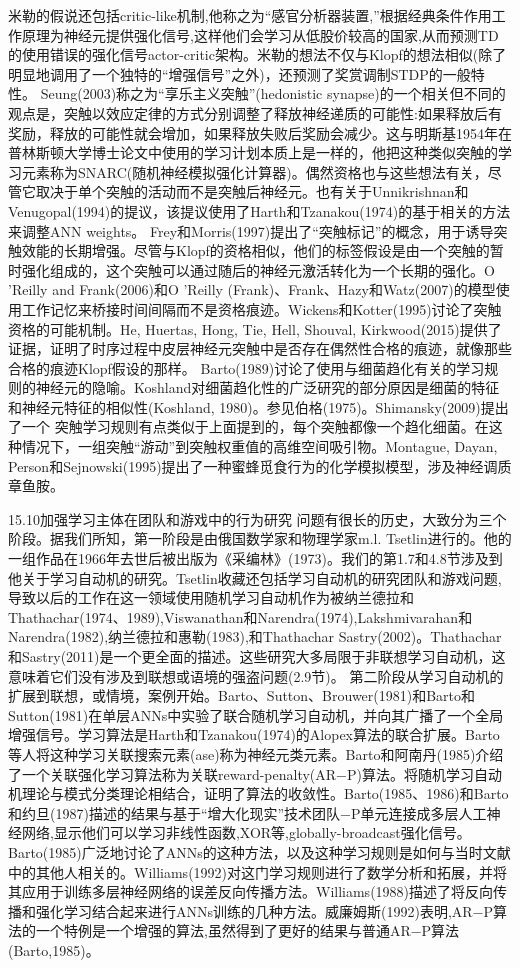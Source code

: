 米勒的假说还包括critic-like机制,他称之为“感官分析器装置,”根据经典条件作用工作原理为神经元提供强化信号,这样他们会学习从低股价较高的国家,从而预测TD的使用错误的强化信号actor-critic架构。米勒的想法不仅与Klopf的想法相似(除了明显地调用了一个独特的“增强信号”之外)，还预测了奖赏调制STDP的一般特性。
Seung(2003)称之为“享乐主义突触”(hedonistic synapse)的一个相关但不同的观点是，突触以效应定律的方式分别调整了释放神经递质的可能性:如果释放后有奖励，释放的可能性就会增加，如果释放失败后奖励会减少。这与明斯基1954年在普林斯顿大学博士论文中使用的学习计划本质上是一样的，他把这种类似突触的学习元素称为SNARC(随机神经模拟强化计算器)。偶然资格也与这些想法有关，尽管它取决于单个突触的活动而不是突触后神经元。也有关于Unnikrishnan和Venugopal(1994)的提议，该提议使用了Harth和Tzanakou(1974)的基于相关的方法来调整ANN weights。
Frey和Morris(1997)提出了“突触标记”的概念，用于诱导突触效能的长期增强。尽管与Klopf的资格相似，他们的标签假设是由一个突触的暂时强化组成的，这个突触可以通过随后的神经元激活转化为一个长期的强化。O 'Reilly and Frank(2006)和O 'Reilly (Frank)、Frank、Hazy和Watz(2007)的模型使用工作记忆来桥接时间间隔而不是资格痕迹。Wickens和Kotter(1995)讨论了突触资格的可能机制。He, Huertas, Hong, Tie, Hell, Shouval, Kirkwood(2015)提供了证据，证明了时序过程中皮层神经元突触中是否存在偶然性合格的痕迹，就像那些合格的痕迹Klopf假设的那样。
Barto(1989)讨论了使用与细菌趋化有关的学习规则的神经元的隐喻。Koshland对细菌趋化性的广泛研究的部分原因是细菌的特征和神经元特征的相似性(Koshland, 1980)。参见伯格(1975)。Shimansky(2009)提出了一个
突触学习规则有点类似于上面提到的，每个突触都像一个趋化细菌。在这种情况下，一组突触“游动”到突触权重值的高维空间吸引物。Montague, Dayan, Person和Sejnowski(1995)提出了一种蜜蜂觅食行为的化学模拟模型，涉及神经调质章鱼胺。

15.10加强学习主体在团队和游戏中的行为研究
问题有很长的历史，大致分为三个阶段。据我们所知，第一阶段是由俄国数学家和物理学家m.l. Tsetlin进行的。他的一组作品在1966年去世后被出版为《采编林》(1973)。我们的第1.7和4.8节涉及到他关于学习自动机的研究。Tsetlin收藏还包括学习自动机的研究团队和游戏问题,导致以后的工作在这一领域使用随机学习自动机作为被纳兰德拉和Thathachar(1974、1989),Viswanathan和Narendra(1974),Lakshmivarahan和Narendra(1982),纳兰德拉和惠勒(1983),和Thathachar Sastry(2002)。Thathachar和Sastry(2011)是一个更全面的描述。这些研究大多局限于非联想学习自动机，这意味着它们没有涉及到联想或语境的强盗问题(2.9节)。
第二阶段从学习自动机的扩展到联想，或情境，案例开始。Barto、Sutton、Brouwer(1981)和Barto和Sutton(1981)在单层ANNs中实验了联合随机学习自动机，并向其广播了一个全局增强信号。学习算法是Harth和Tzanakou(1974)的Alopex算法的联合扩展。Barto等人将这种学习关联搜索元素(ase)称为神经元类元素。Barto和阿南丹(1985)介绍了一个关联强化学习算法称为关联reward-penalty(AR−P)算法。将随机学习自动机理论与模式分类理论相结合，证明了算法的收敛性。Barto(1985、1986)和Barto和约旦(1987)描述的结果与基于“增大化现实”技术团队−P单元连接成多层人工神经网络,显示他们可以学习非线性函数,XOR等,globally-broadcast强化信号。Barto(1985)广泛地讨论了ANNs的这种方法，以及这种学习规则是如何与当时文献中的其他人相关的。Williams(1992)对这门学习规则进行了数学分析和拓展，并将其应用于训练多层神经网络的误差反向传播方法。Williams(1988)描述了将反向传播和强化学习结合起来进行ANNs训练的几种方法。威廉姆斯(1992)表明,AR−P算法的一个特例是一个增强的算法,虽然得到了更好的结果与普通AR−P算法(Barto,1985)。

